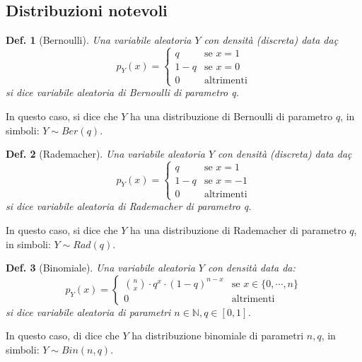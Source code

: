 \documentclass{article}
\newtheorem{definition}{Def.}[section]
\begin{document}
\subsection{Distribuzioni notevoli}
\begin{definition}[Bernoulli]
	Una variabile aleatoria $Y$ con densità (discreta) data daç
	\begin{equation}
		p_Y(x) = 
		\begin{cases}
			q  & \text{se } x = 1\\
			1 - q & \text{se } x = 0\\
			0 &\text{altrimenti}
		\end{cases}
	\end{equation}
	si dice variabile aleatoria di Bernoulli di parametro q.
\end{definition}

In questo caso, si dice che $Y$ ha una distribuzione di Bernoulli di parametro
$q$, in simboli: $Y \sim Ber(q)$.

\begin{definition}[Rademacher]
	Una variabile aleatoria $Y$ con densità (discreta) data daç
	\begin{equation}
		p_Y(x) = 
		\begin{cases}
			q  & \text{se } x = 1\\
			1 - q & \text{se } x = -1\\
			0 &\text{altrimenti}
		\end{cases}
	\end{equation}
	si dice variabile aleatoria di Rademacher di parametro q.
\end{definition}

In questo caso, si dice che $Y$ ha una distribuzione di Rademacher di parametro
$q$, in simboli: $Y \sim Rad(q)$.

\begin{definition}[Binomiale]
	Una variabile aleatoria $Y$ con densità data da:
	\begin{equation}
		p_Y(x) = 
		\begin{cases}
			\binom{n}{x} \cdot q^x \cdot (1 - q)^{n - x} & \text{se } x \in \{0,
			\cdots, n\}\\
			0 & \text{altrimenti}
		\end{cases}
	\end{equation}
	si dice variabile aleatoria di parametri $n \in \mathbb{N}, q \in [0, 1]$.
\end{definition}

In questo caso, di dice che $Y$ ha distribuzione binomiale di parametri $n, q$,
in simboli: $Y \sim Bin(n, q)$.
\end{document}
